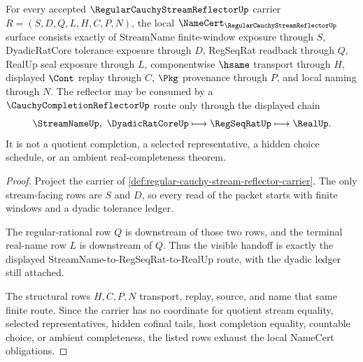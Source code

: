 \begin{theorem}
\label{thm:regular-cauchy-stream-reflector-namecert-obligations}
For every accepted $\RegularCauchyStreamReflectorUp$ carrier $R=(S,D,Q,L,H,C,P,N)$, the local $\NameCert_{\RegularCauchyStreamReflectorUp}$ surface consists exactly of StreamName finite-window exposure through $S$, DyadicRatCore tolerance exposure through $D$, RegSeqRat readback through $Q$, RealUp seal exposure through $L$, componentwise $\hsame$ transport through $H$, displayed $\Cont$ replay through $C$, $\Pkg$ provenance through $P$, and local naming through $N$. The reflector may be consumed by a $\CauchyCompletionReflectorUp$ route only through the displayed chain
$$
\StreamNameUp,\ \DyadicRatCoreUp \longmapsto \RegSeqRatUp \longmapsto \RealUp .
$$
It is not a quotient completion, a selected representative, a hidden choice schedule, or an ambient real-completeness theorem.
\end{theorem}
\begin{proof}
Project the carrier of \autoref{def:regular-cauchy-stream-reflector-carrier}. The only stream-facing rows are $S$ and $D$, so every read of the packet starts with finite windows and a dyadic tolerance ledger.

The regular-rational row $Q$ is downstream of those two rows, and the terminal real-name row $L$ is downstream of $Q$. Thus the visible handoff is exactly the displayed StreamName-to-RegSeqRat-to-RealUp route, with the dyadic ledger still attached.

The structural rows $H,C,P,N$ transport, replay, source, and name that same finite route. Since the carrier has no coordinate for quotient stream equality, selected representatives, hidden cofinal tails, host completion equality, countable choice, or ambient completeness, the listed rows exhaust the local NameCert obligations.
\end{proof}



